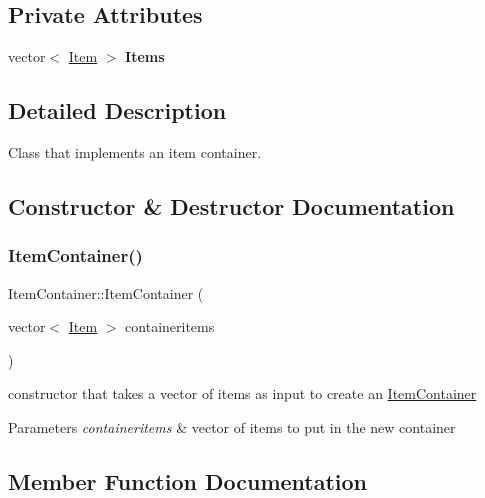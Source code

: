 \subsection*{Private Attributes}
\begin{DoxyCompactItemize}
\item 
\hypertarget{class_item_container_ade39a5da094a28cf8ccfa75b67f0827b}{}\label{class_item_container_ade39a5da094a28cf8ccfa75b67f0827b} 
vector$<$ \hyperlink{class_item}{Item} $>$ {\bfseries Items}
\end{DoxyCompactItemize}


\subsection{Detailed Description}
Class that implements an item container. 

\subsection{Constructor \& Destructor Documentation}
\hypertarget{class_item_container_ab217646cacad74f4c9af8b5c4a0c26a3}{}\label{class_item_container_ab217646cacad74f4c9af8b5c4a0c26a3} 
\subsubsection{\texorpdfstring{Item\+Container()}{ItemContainer()}}
{\footnotesize\ttfamily Item\+Container\+::\+Item\+Container (\begin{DoxyParamCaption}\item[{vector$<$ \hyperlink{class_item}{Item} $>$}]{containeritems }\end{DoxyParamCaption})}

constructor that takes a vector of items as input to create an \hyperlink{class_item_container}{Item\+Container} 
\begin{DoxyParams}{Parameters}
{\em containeritems} & vector of items to put in the new container \\
\hline
\end{DoxyParams}


\subsection{Member Function Documentation}
\hypertarget{class_item_container_ab693023fa4d471748385cb0ae8a49413}{}\label{class_item_container_ab693023fa4d471748385cb0ae8a49413} 
